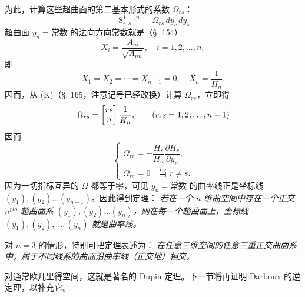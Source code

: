 为此，计算这些超曲面的第二基本形式的系数 \(\Omega_{rs}\)：
\[
 \mathop{\mathrm{S}}_{r,s}^{1,\ldots,n-1}\Omega_{rs}\,dy_r\,dy_s
\]
超曲面 \(y_n=\text{常数}\) 的法向方向常数就是（\S. 154）
\[
 X_i=\frac{A_{ni}}{\sqrt{A_{nn}}},\quad i=1,2,\ldots,n,
\]
即
\[
 X_1=X_2=\cdots=X_{n-1}=0,\quad X_n=\frac1{H_n}.
\]
因而，从 (K)（\S. 165，注意记号已经改换）计算 \(\Omega_{rs}\)，立即得
\[
 \Omega_{rs}=\left[\begin{matrix}rs\\n\end{matrix}\right]\frac1{H_n},\qquad (r,s=1,2,\ldots,n-1)
\]
因而
\[
\tag{42}
 \begin{cases}
 \Omega_{rr}=-\dfrac{H_r}{H_n}\dfrac{\partial H_r}{\partial y_n},\\
 \Omega_{rs}=0\quad \text{当 }r\ne s.
 \end{cases}
\]
因为一切指标互异的 \(\Omega\) 都等于零，可见 \(y_n=\text{常数}\) 的曲率线正是坐标线 \((y_1),(y_2)\ldots(y_{n-1})\)。因此得到定理：
\emph{若在一个 \(n\) 维曲空间中存在一个正交 \(n^{plo}\) 超曲面系 \((y_1),(y_2)\ldots(y_n)\)，则在每一个超曲面上，坐标线 \((y_1),(y_2),\ldots,(y_n)\) 就是曲率线。}

对 \(n=3\) 的情形，特别可把定理表述为：
\emph{在任意三维空间的任意三重正交曲面系中，属于不同线系的曲面沿曲率线（正交地）相交。}

对通常欧几里得空间，这就是著名的 Dupin 定理。下一节将再证明 Darboux 的逆定理，以补充它。

